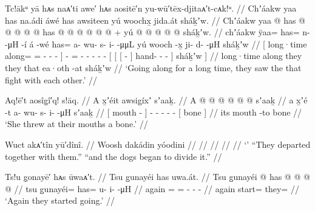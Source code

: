 \ex\label{ex:92-99-saw-shakhw}%
%
\begingl
	\glpreamble	Tc!ākᵘ yā hᴀs naᴀ′ti awe′ hᴀs aositē′n yu-wū′tēx-djitaᴀ′t-cᴀk!ᵘ. //
	\glpreamble	Chʼáakw yaa has na.ádi áwé has awsiteen yú woochx̱ jida.át sháḵʼw. //
	\gla	{} Chʼáakw yaa @ has @  @ {} @ {} @ {} {}
		 @ {}
		has @  @ {} @ {} @ {} @ {} @ {} +
		{} yú {} {}  @ {} {}  @ {} @ {} @ {} @ {} {}
			sháḵʼw. {} //
	\glb	{} chʼáakw ÿaa= has= n-  -μH -í {}
		á -wé
		has= a- wu- s- i-  -μμL
		{} yú {} {} wooch -x̱ {} ji- d-  -μH {} {}
			sháḵʼw {} //
	\glc	{}[ long·time along= = -
			 - - {}]
		 -
		= - - - -  -
		{}[  {}[ {}[  - {}]
			hand- -  - \· {}]
			sháḵʼw {}] //
	\gld	{} long·time along they  {} {} {} {}
		 {}
		they  {} {} {} {} {}
		{} that {} {} ea·oth -at {}  {} {} {} {} {}
			sháḵʼw {} //
	\glft	‘Going along for a long time, they saw the  that fight with each other.’
		//
\endgl
\xe

\ex\label{ex:92-100-threw-bone}%
%
\begingl
	\glpreamble	Aq!ē′t aosîg̣î′q! s!āq. //
	\glpreamble	A x̱ʼéit awsig̱íxʼ sʼaaḵ. //
	\gla	{} A  @ {} {}
		 @ {} @ {} @ {} @ {} @ {}
		{} sʼaaḵ {} //
	\glb	{} a x̱ʼé -t {}
		a- wu- s- i-  -μH
		{} sʼaaḵ {} //
	\glc	{}[  mouth - {}]
		- - - -  -
		{}[ bone {}] //
	\gld	{} its mouth -to {}
		 {} {} {} {} {}
		{} bone {} //
	\glft	‘She threw at their mouths a bone.’
		//
\endgl
\xe

\ex\label{ex:92-101-}%
%
\begingl
	\glpreamble	Wuct akᴀ′tîn yū′dînî. //
	\glpreamble	Woosh dakádin yóodini //
	\gla	 //
	\glb	 //
	\glc	 //
	\gld	 //
	\glft	‘’\newline
		“They departed together with them.”\newline
		“and the dogs began to divide it.”
		//
\endgl
\xe

\ex\label{ex:92-102-again-start-going}%
%
\begingl
	\glpreamble	Ts!u g̣onayē′ hᴀs ūwaᴀ′t. //
	\glpreamble	Tsu g̱unayéi has uwa.át. //
	\gla	Tsu g̱unayéi @ has @  @ {} @ {} @ {} //
	\glb	tsu g̱unayéi= has= u- i-  -μH //
	\glc	again = = - -  - //
	\gld	again start= they=  {} {} {} //
	\glft	‘Again they started going.’
		//
\endgl
\xe

